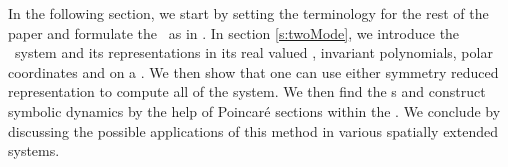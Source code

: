 In the following section, we start by setting the terminology for the rest 
of the paper and formulate the \mslices\ as in . In 
section \ref{s:twoMode}, we introduce the \twoMode\ system and its representations
in its real valued \statesp , invariant polynomials, polar coordinates and
on a \slice . We then show that one can use either symmetry reduced representation
to compute all \reqva of the system. We then find the \rpo s and construct
symbolic dynamics by the help of Poincar\'e sections within the \slice . 
We conclude by discussing the possible applications of this method in various 
spatially extended systems.
